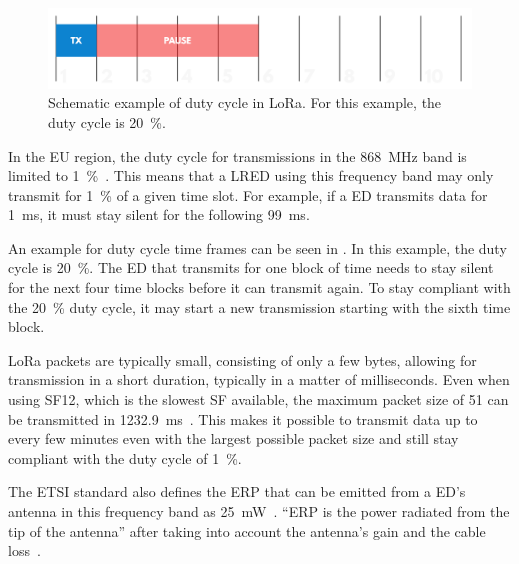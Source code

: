 \begin{figure}[htbp]
    \centering
    \includegraphics[width=.8\textwidth]{pictures/lora/duty-cycle-single-channel-off-air.png}
    \caption[Schematic example of duty cycle in \acs{LoRa}.]{
        Schematic example of duty cycle in \ac{LoRa}.
        For this example, the duty cycle is \SI{20}{\percent}.~\protect\cite{the_things_industries_bv_duty_nodate}
    }\label{pic:lora-duty-cycle}
\end{figure}

In the \ac{EU} region, the duty cycle for transmissions in the \SI{868}{\mega\hertz} band is limited to \SI{1}{\percent}~\cite[p. 29]{etsi_etsi_2012}.
This means that a \acl{LRED} using this frequency band may only transmit for \SI{1}{\percent} of a given time slot.
For example, if a \acl{ED} transmits data for \SI{1}{\milli\second}, it must stay silent for the following \SI{99}{\milli\second}.

An example for duty cycle time frames can be seen in .
In this example, the duty cycle is \SI{20}{\percent}.
The \acl{ED} that transmits for one block of time needs to stay silent for the next four time blocks before it can transmit again.
To stay compliant with the \SI{20}{\percent} duty cycle, it may start a new transmission starting with the sixth time block.

LoRa packets are typically small, consisting of only a few bytes, allowing for transmission in a short duration, typically in a matter of milliseconds.
Even when using \acs{SF}12, which is the slowest \acs{SF} available, the maximum packet size of \SI{51}{\byte} can be transmitted in  \SI{1232.9}{\milli\second}~\cite[p. 6]{the_things_network_lorawan_nodate}\cite[p. 10f]{lora_alliance_inc_lorawan_regional_2017}.
This makes it possible to transmit data up to every few minutes even with the largest possible packet size and still stay compliant with the duty cycle of \SI{1}{\percent}.

The ETSI standard also defines the \acf{ERP} that can be emitted from a \acl{ED}'s antenna in this frequency band as \SI{25}{\milli\watt}~\cite[p. 29]{etsi_etsi_2012}.
``\ac{ERP} is the power radiated from the tip of the antenna'' after taking into account the antenna's gain and the cable loss~\cite[p. 23]{faruque_radio_2015}.

